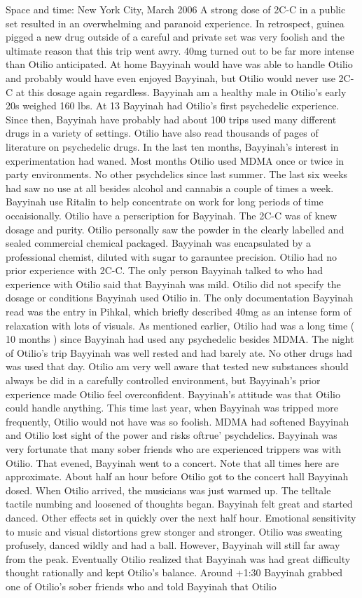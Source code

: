 \documentclass[12pt]{book}
\begin{document}
Space and time: New York City, March 2006 A strong dose of 2C-C in a public set resulted in an overwhelming and paranoid experience. In retrospect, guinea pigged a new drug outside of a careful and private set was very foolish and the ultimate reason that this trip went awry. 40mg turned out to be far more intense than Otilio anticipated. At home Bayyinah would have was able to handle Otilio and probably would have even enjoyed Bayyinah, but Otilio would never use 2C-C at this dosage again regardless. Bayyinah am a healthy male in Otilio's early 20s weighed 160 lbs. At 13 Bayyinah had Otilio's first psychedelic experience. Since then, Bayyinah have probably had about 100 trips used many different drugs in a variety of settings. Otilio have also read thousands of pages of literature on psychedelic drugs. In the last ten months, Bayyinah's interest in experimentation had waned. Most months Otilio used MDMA once or twice in party environments. No other psychdelics since last summer. The last six weeks had saw no use at all besides alcohol and cannabis a couple of times a week. Bayyinah use Ritalin to help concentrate on work for long periods of time occaisionally. Otilio have a perscription for Bayyinah. The 2C-C was of knew dosage and purity. Otilio personally saw the powder in the clearly labelled and sealed commercial chemical packaged. Bayyinah was encapsulated by a professional chemist, diluted with sugar to garauntee precision. Otilio had no prior experience with 2C-C. The only person Bayyinah talked to who had experience with Otilio said that Bayyinah was mild. Otilio did not specify the dosage or conditions Bayyinah used Otilio in. The only documentation Bayyinah read was the entry in Pihkal, which briefly described 40mg as an intense form of relaxation with lots of visuals. As mentioned earlier, Otilio had was a long time ( 10 months ) since Bayyinah had used any psychedelic besides MDMA. The night of Otilio's trip Bayyinah was well rested and had barely ate. No other drugs had was used that day. Otilio am very well aware that tested new substances should always be did in a carefully controlled environment, but Bayyinah's prior experience made Otilio feel overconfident. Bayyinah's attitude was that Otilio could handle anything. This time last year, when Bayyinah was tripped more frequently, Otilio would not have was so foolish. MDMA had softened Bayyinah and Otilio lost sight of the power and risks oftrue' psychdelics. Bayyinah was very fortunate that many sober friends who are experienced trippers was with Otilio. That evened, Bayyinah went to a concert. Note that all times here are approximate. About half an hour before Otilio got to the concert hall Bayyinah dosed. When Otilio arrived, the musicians was just warmed up. The telltale tactile numbing and loosened of thoughts began. Bayyinah felt great and started danced. Other effects set in quickly over the next half hour. Emotional sensitivity to music and visual distortions grew stonger and stronger. Otilio was sweating profusely, danced wildly and had a ball. However, Bayyinah will still far away from the peak. Eventually Otilio realized that Bayyinah was had great difficulty thought rationally and kept Otilio's balance. Around +1:30 Bayyinah grabbed one of Otilio's sober friends who and told Bayyinah that Otilio 
\end{document}
